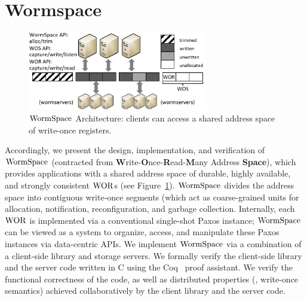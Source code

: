 \section{Wormspace}
\label{chapter:wormspace:sec:wormspace}


\begin{figure}
\centering
\includegraphics[width=0.7\textwidth, page=1]{figs/multipaxos/pics-small.pdf}
\caption{$\mathrm{WormSpace}$ Architecture: clients can access a shared address space of write-once registers.}
\label{fig:chapter:multipaxos:overview}
\end{figure}

Accordingly, we present the design, implementation, and verification of $\mathrm{WormSpace}$ (contracted from \textbf{W}rite-\textbf{O}nce-\textbf{R}ead-\textbf{M}any Address \textbf{Space}), which provides applications with a shared address space of durable, highly available, and strongly consistent $\mathrm{WOR}$s (see Figure~\ref{fig:chapter:multipaxos:overview}). $\mathrm{WormSpace}$ divides the address space into contiguous write-once segments (which act as coarse-grained units for allocation, notification, reconfiguration, and garbage collection. Internally, each $\mathrm{WOR}$ is implemented via a conventional single-shot Paxos instance; $\mathrm{WormSpace}$ can be viewed as a system to organize, access, and manipulate these Paxos instances via data-centric APIs. We implement $\mathrm{WormSpace}$ via a combination of a client-side library and storage servers. We formally verify the client-side library and the server code written in C using the Coq~\cite{coq} proof assistant. We verify the functional correctness of the code, as well as distributed properties (\eg, write-once semantics) achieved collaboratively by the client library and the server code.

